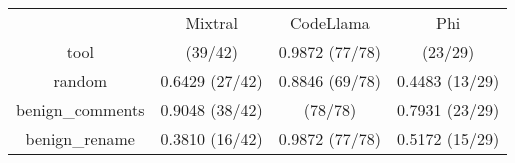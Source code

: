 \begin{table}[h!]
\centering
\begin{tabular}{|c|c|c|c|}
\hline
 & Mixtral & CodeLlama & Phi \\

tool & \cellcolor{blue!10}{0.9286} (39/42) & 0.9872 (77/78) & \cellcolor{blue!10}{0.7931} (23/29) \\

random & 0.6429 (27/42) & 0.8846 (69/78) & 0.4483 (13/29) \\

benign_comments & 0.9048 (38/42) & \cellcolor{blue!10}{1.0000} (78/78) & 0.7931 (23/29) \\

benign_rename & 0.3810 (16/42) & 0.9872 (77/78) & 0.5172 (15/29) \\

\end{tabular}
\end{table}